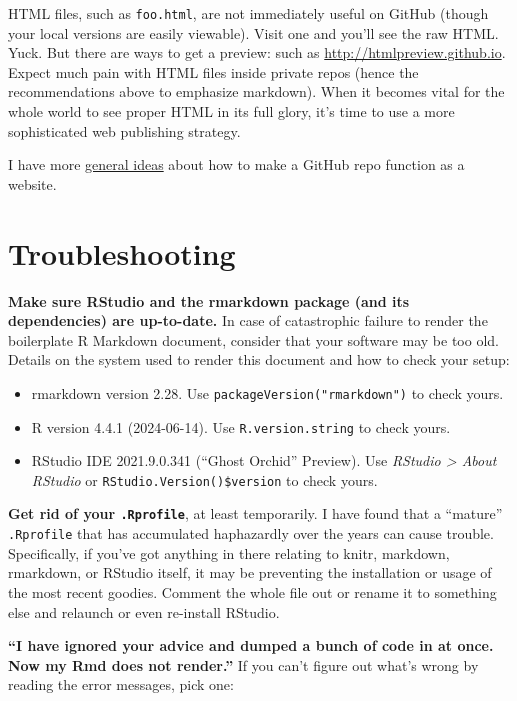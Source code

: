 \documentclass[
]{book}
\providecommand{\tightlist}{%
  \setlength{\itemsep}{0pt}\setlength{\parskip}{0pt}}
\begin{document}
HTML files, such as \texttt{foo.html}, are not immediately useful on GitHub (though your local versions are easily viewable).
Visit one and you'll see the raw HTML.
Yuck.
But there are ways to get a preview: such as \url{http://htmlpreview.github.io}. Expect much pain with HTML files inside private repos (hence the recommendations above to emphasize markdown).
When it becomes vital for the whole world to see proper HTML in its full glory, it's time to use a more sophisticated web publishing strategy.

I have more \hyperref[workflows-browsability]{general ideas} about how to make a GitHub repo function as a website.

\section{Troubleshooting}\label{rmd-troubleshooting}

\textbf{Make sure RStudio and the rmarkdown package (and its dependencies) are up-to-date.}
In case of catastrophic failure to render the boilerplate R Markdown document, consider that your software may be too old.
Details on the system used to render this document and how to check your setup:

\begin{itemize}
\tightlist
\item
  rmarkdown version 2.28.
  Use \texttt{packageVersion("rmarkdown")} to check yours.
\item
  R version 4.4.1 (2024-06-14). Use \texttt{R.version.string} to check yours.
\item
  RStudio IDE 2021.9.0.341 (``Ghost Orchid'' Preview).
  Use \emph{RStudio \textgreater{} About RStudio} or \texttt{RStudio.Version()\$version} to check yours.
\end{itemize}

\textbf{Get rid of your \texttt{.Rprofile}}, at least temporarily.
I have found that a ``mature'' \texttt{.Rprofile} that has accumulated haphazardly over the years can cause trouble.
Specifically, if you've got anything in there relating to knitr, markdown, rmarkdown, or RStudio itself, it may be preventing the installation or usage of the most recent goodies.
Comment the whole file out or rename it to something else and relaunch or even re-install RStudio.

\textbf{``I have ignored your advice and dumped a bunch of code in at once. Now my Rmd does not render.''}
If you can't figure out what's wrong by reading the error messages, pick one:
\end{document}
